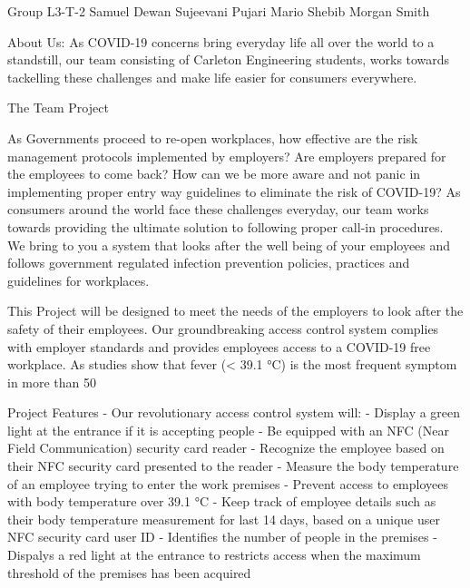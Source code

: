Group L3-T-2
  Samuel Dewan
  Sujeevani Pujari 
  Mario Shebib 
  Morgan Smith 

About Us:
  As COVID-19 concerns bring everyday life all over the world to a standstill, our team consisting of Carleton Engineering students, works towards tackelling these challenges and make life easier for consumers everywhere.

The Team Project 

  As Governments proceed to re-open workplaces, how effective are the risk management protocols implemented by employers? Are employers prepared for the employees to come back? How can we be more aware and not panic in implementing proper entry way guidelines to eliminate the risk of COVID-19? As consumers around the world face these challenges everyday, our team works towards providing the ultimate solution to following proper call-in procedures. We bring to you a system that looks after the well being of your employees and follows government regulated infection prevention policies, practices and guidelines for workplaces. 

  This Project will be designed to meet the needs of the employers to look after the safety of their employees. Our groundbreaking access control system complies with employer standards and provides employees access to a COVID-19 free workplace. As studies show that fever (< 39.1 °C) is the most frequent symptom in more than 50%

Project Features
- Our revolutionary access control system will:
- Display a green light at the entrance if it is accepting people
- Be equipped with an NFC (Near Field Communication) security card reader
- Recognize the employee based on their NFC security card presented to the reader 
- Measure the body temperature of an employee trying to enter the work premises 
- Prevent access to employees with body temperature over 39.1 °C
- Keep track of employee details such as their body temperature measurement for last 14 days, based on a unique user NFC security card user ID
- Identifies the number of people in the premises 
- Dispalys a red light at the entrance to restricts access when the maximum threshold of the premises has been acquired


